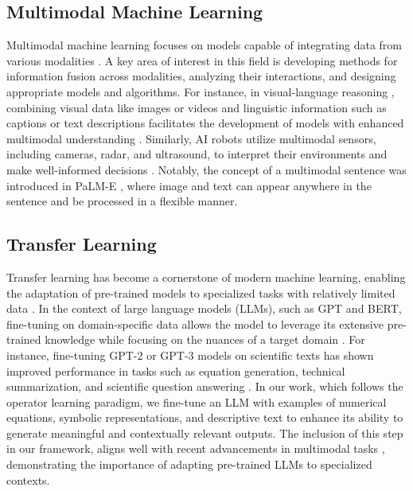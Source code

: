 \documentclass{article}
\begin{document}
\subsection{Multimodal Machine Learning}
Multimodal machine learning focuses on models capable of integrating data from various modalities \cite{lu2019vilbert, sun2019videobert, tan2019lxmert,xu2023multimodal}. A key area of interest in this field is developing methods for information fusion across modalities, analyzing their interactions, and designing appropriate models and algorithms. For instance, in visual-language reasoning \cite{tan2019lxmert, sun2019videobert, li2019visualbert}, combining visual data like images or videos and linguistic information such as captions or text descriptions \cite{tan2019lxmert} facilitates the development of models with enhanced multimodal understanding \cite{li2019visualbert}. Similarly, AI robots utilize multimodal sensors, including cameras, radar, and ultrasound, to interpret their environments and make well-informed decisions \cite{feng2020deep, liu2021multimodal}. Notably, the concept of a multimodal sentence was introduced in PaLM-E \cite{driess2023palm}, where image and text can appear anywhere in the sentence and be processed in a flexible manner. 


\subsection{Transfer Learning}
Transfer learning has become a cornerstone of modern machine learning, enabling the adaptation of pre-trained models to specialized tasks with relatively limited data \cite{pan2009survey}. In the context of large language models (LLMs), such as GPT and BERT, fine-tuning on domain-specific data allows the model to leverage its extensive pre-trained knowledge while focusing on the nuances of a target domain \cite{radford2019language, kenton2019bert}. For instance, fine-tuning GPT-2 or GPT-3 models on scientific texts has shown improved performance in tasks such as equation generation, technical summarization, and scientific question answering \cite{brown2020language}. In our work, which follows the operator learning paradigm, we fine-tune an LLM with examples of numerical equations, symbolic representations, and descriptive text to enhance its ability to generate meaningful and contextually relevant outputs. The inclusion of this step in our framework, aligns well with recent advancements in multimodal tasks \cite{han2021pre,liu2024prose,sun2024towards}, demonstrating the importance of adapting pre-trained LLMs to specialized contexts.
\end{document}
